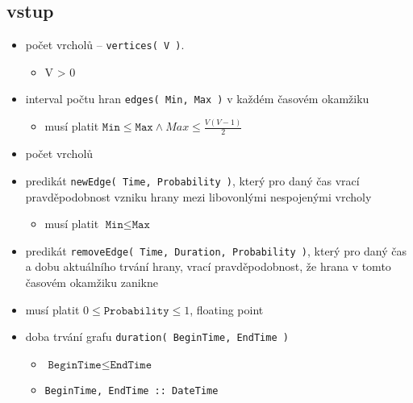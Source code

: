 \documentclass[11pt, a4paper]{article}
\newcommand{\pl}[1]{\texttt{#1}} %
\theoremstyle{plain}
\theoremstyle{definition}
\theoremstyle{remark}
\begin{document}
\subsection{vstup}
\begin{itemize}
    \item počet vrcholů -- \pl{vertices( V )}.
        \begin{itemize}
            \item V > 0
        \end{itemize}
    \item interval počtu hran \pl{edges( Min, Max )} v každém časovém okamžiku
        \begin{itemize}
            \item musí platit $\pl{Min} \le \pl{Max} \land Max \le \frac{ V(V-1)}{2}$
        \end{itemize}
    \item počet vrcholů
    \item predikát \pl{newEdge( Time, Probability )}, který pro daný čas vrací
          pravděpodobnost vzniku hrany mezi libovonlými nespojenými vrcholy
        \begin{itemize}
            \item musí platit $\pl{Min} \le \pl{Max}$
        \end{itemize}
    \item predikát \pl{removeEdge( Time, Duration, Probability )}, který pro daný čas
    a dobu aktuálního trvání hrany, vrací pravděpodobnost, že hrana v tomto
    časovém okamžiku zanikne
    \item musí platit $0 \le \pl{Probability} \le 1$, floating point
    \item doba trvání grafu \pl{duration( BeginTime, EndTime )}
        \begin{itemize}
            \item $\pl{BeginTime} \le \pl{EndTime}$
            \item \texttt{BeginTime, EndTime :: DateTime}
        \end{itemize}
\end{itemize}
\end{document}
